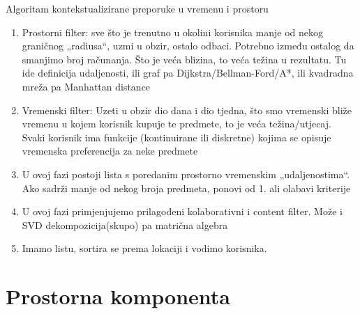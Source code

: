 \documentclass[times, utf8, diplomski, numeric]{fer}
\begin{document}
\begin{algorithm}
	\caption{Algoritam kontekstualizirane preporuke u vremenu i prostoru}
	\label{algo:TheAlgo}
	\begin{algorithmic}
		
		\ENDFOR
		
		
		\ENDFOR
		
		
	\end{algorithmic}
\end{algorithm}

\begin{enumerate}
  \item Prostorni filter: sve što je trenutno u okolini korisnika manje od
  nekog graničnog „radiusa“, uzmi u obzir, ostalo odbaci. Potrebno između
  ostalog da smanjimo broj računanja. Što je veća blizina, to veća težina u
  rezultatu. Tu ide definicija udaljenosti, ili graf pa
  Dijkstra/Bellman-Ford/A*, ili kvadradna mreža pa Manhattan distance
  
  \item Vremenski filter: Uzeti u obzir dio dana i dio tjedna, što smo
  vremenski bliže vremenu u kojem korisnik kupuje te predmete, to je veća
  težina/utjecaj. Svaki korisnik ima funkcije (kontinuirane ili diskretne)
  kojima se opisuje vremenska preferencija za neke predmete
  
  \item U ovoj fazi postoji lista s poredanim prostorno vremenskim
  „udaljenostima“. Ako sadrži manje od nekog broja predmeta, ponovi od 1. ali
  olabavi kriterije
  
  \item U ovoj fazi primjenjujemo prilagođeni kolaborativni i content filter.
  Može i SVD dekompozicija(skupo) pa matrična algebra
  
  \item Imamo listu, sortira se prema lokaciji i vodimo korisnika.
  
\end{enumerate}

\section{Prostorna komponenta}
\end{document}
